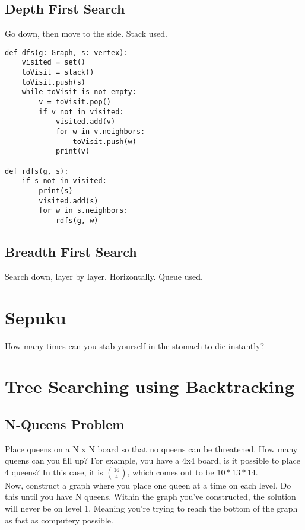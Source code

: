 \documentclass{article}
\begin{document}
\subsection{Depth First Search}
\label{sec:org6a3492f}
Go down, then move to the side. Stack used.
\begin{verbatim}
def dfs(g: Graph, s: vertex):
    visited = set()
    toVisit = stack()
    toVisit.push(s)
    while toVisit is not empty:
        v = toVisit.pop()
        if v not in visited:
            visited.add(v)
            for w in v.neighbors:
                toVisit.push(w)
            print(v)

def rdfs(g, s):
    if s not in visited:
        print(s)
        visited.add(s)
        for w in s.neighbors:
            rdfs(g, w)
\end{verbatim}

\subsection{Breadth First Search}
\label{sec:org1f73ce2}
Search down, layer by layer. Horizontally. Queue used.

\section{Sepuku}
\label{sec:org5a8b2eb}
How many times can you stab yourself in the stomach to die instantly?

\section{Tree Searching using Backtracking}
\label{sec:orgaca41c6}
\subsection{N-Queens Problem}
\label{sec:orgb63c674}
Place queens on a N x N board so that no queens can be threatened. How many queens can you fill up?
For example, you have a 4x4 board, is it possible to place 4 queens? In this case, it is \({16 \choose 4}\), which comes out to be \(10 * 13 * 14\). \\

Now, construct a graph where you place one queen at a time on each level. Do this until you have N queens. Within the graph you've constructed, the solution will never be on level 1. Meaning you're trying to reach the bottom of the graph as fast as computery possible.\\
\end{document}
